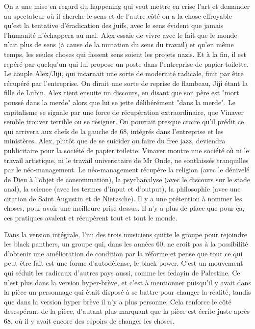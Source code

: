 \documentclass[a4paper,12pt]{book}
\begin{document}
\par On a une mise en regard du happening qui veut mettre en crise l'art et demander au spectateur où il cherche le sens et de l'autre côté on a la chose effroyable qu'est la tentative d'éradication des juifs, avec le sens évident que jamais l'humanité n'échappera au mal. Alex essaie de vivre avec le fait que le monde n'ait plus de sens (à cause de la mutation du sens du travail) et qu'en même temps, les seules choses qui fassent sens soient les projets nazis. Et à la fin, il est repéré par quelqu'un qui lui propose un poste dans l'entreprise de papier toilette. Le couple Alex/Jiji, qui incarnait une sorte de modernité radicale, finit par être récupéré par l'entreprise. On dirait une sorte de reprise de flambeau, Jiji étant la fille de Lubin. Alex tient ensuite un discours, en disant que son père est "mort poussé dans la merde" alors que lui se jette délibérément "dans la merde". Le capitalisme se signale par une force de récupération extraordinaire, que Vinaver semble trouver terrible ou se résigner. On pourrait presque croire qu'il prédit ce qui arrivera aux chefs de la gauche de 68, intégrés dans l'entreprise et les ministères. Alex, plutôt que de se suicider ou faire du free jazz, deviendra publicitaire pour la société de papier toilette. Vinaver montre une société où ni le travail artistique, ni le travail universitaire de Mr Onde, ne sontlaissés tranquilles par le néo-management. Le néo-management récupère la religion (avec le dénivelé de Dieu à l'objet de consommation), la psychanalyse (avec le discours sur le stade anal), la science (avec les termes d'input et d'output), la philosophie (avec une citation de Saint Augustin et de Nietzsche). Il y a une prétention à nommer les choses, pour avoir une meilleure prise dessus. Il n'y a plus de place que pour ça, ces pratiques avalent et récupèrent tout et tout le monde.
\par Dans la version intégrale, l'un des trois musiciens quitte le groupe pour rejoindre les black panthers, un groupe qui, dans les années 60, ne croit pas à la possibilité d'obtenir une amélioration de condition par la réforme et pense que tout ce qui peut être fait est une forme d'autodéfense, le black power. C'est un mouvement qui séduit les radicaux d'autres pays aussi, comme les fedayin de Palestine. Ce n'est plus dans la version hyper-brève, et c'est à mentionner puisqu'il y avait dans la pièce un personnage qui était disposé à se battre pour changer la réalité, tandis que dans la version hyper brève il n'y a plus personne. Cela renforce le côté desespérant de la pièce, d'autant plus marquant que la pièce est écrite juste après 68, où il y avait encore des espoirs de changer les choses.
\end{document}

